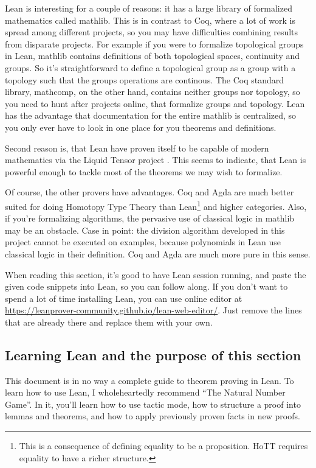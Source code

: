 \documentclass[a4paper, 12pt]{article}
\theoremstyle{changedot}
\theoremstyle{changedotbreak}
\theoremstyle{nonumberplain}
\begin{document}
Lean is interesting for a couple of reasons: it has a large library of formalized mathematics called mathlib. This is in contrast to Coq, where a lot of work is spread among different projects, so you may have difficulties combining results from disparate projects. For example if you were to formalize topological groups in Lean, mathlib contains definitions of both topological spaces, continuity and groups. So it's straightforward to define a topological group as a group with a topology such that the groups operations are continous. The Coq standard library, mathcomp, on the other hand, contains neither groups nor topology, so you need to hunt after projects online, that formalize groups and topology. Lean has the advantage that documentation for the entire mathlib is centralized, so you only ever have to look in one place for you theorems and definitions.

Second reason is, that Lean have proven itself to be capable of modern mathematics via the Liquid Tensor project \cite{LiquidTensor}. This seems to indicate, that Lean is powerful enough to tackle most of the theorems we may wish to formalize.

Of course, the other provers have advantages. Coq and Agda are much better suited for doing Homotopy Type Theory than Lean\footnote{This is a consequence of defining equality to be a proposition. HoTT requires equality to have a richer structure.}  and higher categories. Also, if you're formalizing algorithms, the pervasive use of classical logic in mathlib may be an obstacle. Case in point: the division algorithm developed in this project cannot be executed on examples, because polynomials in Lean use classical logic in their definition. Coq and Agda are much more pure in this sense.

When reading this section, it's good to have Lean session running, and paste the given code snippets into Lean, so you can follow along. If you don't want to spend a lot of time installing Lean, you can use online editor at \url{https://leanprover-community.github.io/lean-web-editor/}. Just remove the lines that are already there and replace them with your own.

\subsection{Learning Lean and the purpose of this section}
This document is in no way a complete guide to theorem proving in Lean. To learn how to use Lean, I wholeheartedly recommend ``The Natural Number Game''\cite{natnumgame}. In it, you'll learn how to use tactic mode, how to structure a proof into lemmas and theorems, and how to apply previously proven facts in new proofs.
\end{document}
